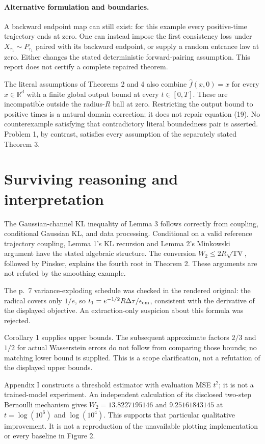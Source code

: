 \documentclass[10pt]{article}
\begin{document}
\paragraph*{Alternative formulation and boundaries.}\mbox{}\par
A backward endpoint map can still exist: for this example every positive-time trajectory ends at zero. One can instead impose the first consistency loss under \(X_{\tau_1}\sim P_{\tau_1}\) paired with its backward endpoint, or supply a random entrance law at zero. Either changes the stated deterministic forward-pairing assumption. This report does not certify a complete repaired theorem.\par
The literal assumptions of Theorems 2 and 4 also combine \(\widehat f(x,0)=x\) for every \(x\in\mathbb R^d\) with a finite global output bound at every \(t\in[0,T]\). These are incompatible outside the radius-\(R\) ball at zero. Restricting the output bound to positive times is a natural domain correction; it does not repair equation (19). No counterexample satisfying that contradictory literal boundedness pair is asserted. Problem 1, by contrast, satisfies every assumption of the separately stated Theorem 3.\par
\section*{Surviving reasoning and interpretation}
The Gaussian-channel KL inequality of Lemma 3 follows correctly from coupling, conditional Gaussian KL, and data processing. Conditional on a valid reference trajectory coupling, Lemma 1’s KL recursion and Lemma 2’s Minkowski argument have the stated algebraic structure. The conversion \(W_2\le2R\sqrt{\operatorname{TV}}\), followed by Pinsker, explains the fourth root in Theorem 2. These arguments are not refuted by the smoothing example.\par
The p. 7 variance-exploding schedule was checked in the rendered original: the radical covers only \(1/e\), so \(t_1=e^{-1/2}R\Delta\tau/\epsilon_{\rm cm}\), consistent with the derivative of the displayed objective. An extraction-only suspicion about this formula was rejected.\par
Corollary 1 supplies upper bounds. The subsequent approximate factors \(2/3\) and \(1/2\) for actual Wasserstein errors do not follow from comparing those bounds; no matching lower bound is supplied. This is a scope clarification, not a refutation of the displayed upper bounds.\par
Appendix I constructs a threshold estimator with evaluation MSE \(t^2\); it is not a trained-model experiment. An independent calculation of its disclosed two-step Bernoulli mechanism gives \(W_2=13.8227195146\) and \(9.25161843145\) at \(t=\log(10^6)\) and \(\log(10^4)\). This supports that particular qualitative improvement. It is not a reproduction of the unavailable plotting implementation or every baseline in Figure 2.\par
\end{document}
